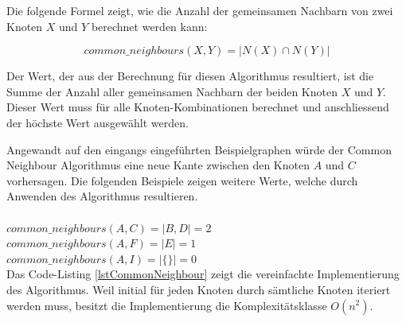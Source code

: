 Die folgende Formel zeigt, wie die Anzahl der gemeinsamen Nachbarn von zwei Knoten $X$ und $Y$ berechnet werden kann:

\begin{equation}
\label{eq:cn}
    common\_neighbours(X,Y) = | N(X) \cap N(Y) |
\end{equation}

Der Wert, der aus der Berechnung für diesen Algorithmus resultiert, ist die Summe der Anzahl aller gemeinsamen
Nachbarn der beiden Knoten $X$ und $Y$. Dieser Wert muss für alle Knoten-Kombinationen berechnet und anschliessend der höchste
Wert ausgewählt werden.

Angewandt auf den eingangs eingeführten Beispielgraphen würde der Common Neighbour Algorithmus eine neue Kante zwischen den Knoten $A$ und $C$ vorhersagen.
Die folgenden Beispiele zeigen weitere Werte, welche durch Anwenden des Algorithmus resultieren.\\
\\
\vspace{4mm}
\newcommand{\forceindent}{\leavevmode{\parindent=2em\indent}}
\forceindent $common\_neighbours(A,C) = |{B, D}| = 2$\\
\vspace{4mm}
\forceindent $common\_neighbours(A,F) = |{E}| = 1$\\
\vspace{4mm}
\forceindent $common\_neighbours(A,I) = |{\{\}}| = 0$\\

Das Code-Listing \ref{lstCommonNeighbour} zeigt die vereinfachte Implementierung des Algorithmus.
Weil initial für jeden Knoten durch sämtliche Knoten iteriert werden muss, besitzt die Implementierung die Komplexitätsklasse $O(n^2)$.

